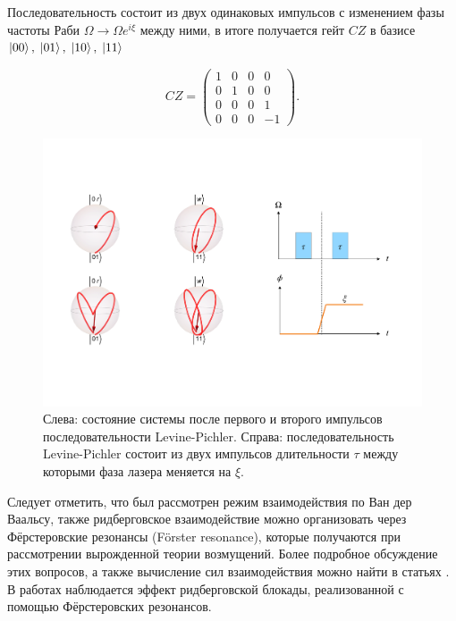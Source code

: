 Последовательность состоит из двух одинаковых импульсов с изменением фазы частоты Раби $\Omega \rightarrow \Omega e^{i\xi}$ между ними, в итоге получается гейт $CZ$ в базисе $\left| 00 \right\rangle, \; \left| 01 \right\rangle, \; \left| 10 \right\rangle, \; \left| 11 \right\rangle$ 

\begin{equation}
	CZ = \begin{pmatrix}
		1 & 0 & 0 & 0\\
		0 & 1 & 0 & 0\\
		0 & 0 & 0 & 1\\
		0 & 0 & 0 & -1
	\end{pmatrix}.
\end{equation}

\begin{figure}[ht]
	\centering
	\includegraphics[width=1.0\textwidth]{images/LP_total.pdf}
	\caption{Слева: состояние системы после первого и второго импульсов последовательности Levine-Pichler. Справа: последовательность Levine-Pichler состоит из двух импульсов длительности $\tau$ между которыми фаза лазера меняется на $\xi$.}
	\label{fig:LP_total}
\end{figure}


Следует отметить, что был рассмотрен режим взаимодействия по Ван дер Ваальсу, также ридберговское взаимодействие можно организовать через Фёрстеровские резонансы (Förster resonance), которые получаются при рассмотрении вырожденной теории возмущений. Более подробное обсуждение этих вопросов, а также вычисление сил взаимодействия можно найти в статьях \cite{Saffman_Rydberg1, Saffman_Rydberg2,PhysRevLett.85.2208}. В работах \cite{Chew:2022aa,Urban:2009aa} наблюдается эффект ридберговской блокады, реализованной с помощью Фёрстеровских резонансов. 

